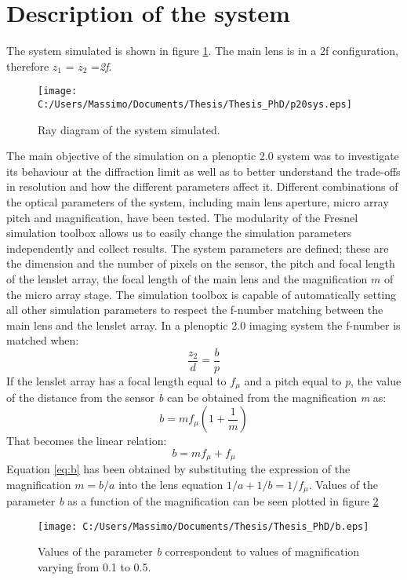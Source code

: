 \section{Description of the system}
\label{sec:descrSYS20}
The system simulated is shown in figure \ref{fig:sys}. The main lens is in a 2f configuration, therefore $z_1$ = $z_2$ =\textit{2f}.
\begin{figure}[H]
	\centering
	\texttt{[image: C:/Users/Massimo/Documents/Thesis/Thesis\_PhD/p20sys.eps]}
	\caption{\label{fig:sys} Ray diagram of the system simulated.  }
\end{figure}
The main objective of the simulation on a plenoptic 2.0 system was to investigate its behaviour at the diffraction limit as well as to better understand the trade-offs in resolution and how the different parameters affect it. Different combinations of the optical parameters of the system, including main lens aperture, micro array pitch and magnification,  have been tested. The modularity of the Fresnel simulation toolbox allows us to easily change the simulation parameters independently and collect results.
The system parameters are defined; these are the  dimension and the number of pixels on the sensor, the pitch and focal length of the lenslet array, the focal length of the main lens and the magnification $m$ of the micro array stage. The simulation toolbox is capable of automatically setting all other simulation parameters to respect the f-number matching between the main lens and the lenslet array. In a plenoptic 2.0 imaging system the f-number is matched when:
\begin{equation}
\label{eq:fmatch20}
\dfrac{z_2}{d}=\dfrac{b}{p}
\end{equation}
If the lenslet array has a focal length equal to $f_{\mu}$ and a pitch equal to \textit{p}, the value of the distance from the sensor \textit{b} can be obtained from the magnification \textit{m} as:
\begin{equation}
\label{eq:b}
b = mf_{\mu} \left(1+\dfrac{1}{m}\right)
\end{equation} 
That becomes the linear relation:
\begin{equation}
\label{eq:b1}
b = mf_{\mu}+f_{\mu}
\end{equation} 
Equation \ref{eq:b} has been obtained by substituting the expression of the magnification $m=b/a$ into the lens equation $1/a+1/b=1/f_{\mu}$.
Values of the parameter \textit{b} as a function of the magnification can be seen plotted in figure \ref{fig:b}
\begin{figure}[H]
	\centering
	\texttt{[image: C:/Users/Massimo/Documents/Thesis/Thesis\_PhD/b.eps]}
	\caption{\label{fig:b} Values of the parameter \textit{b} correspondent to values of magnification varying from 0.1 to 0.5.}
\end{figure}
